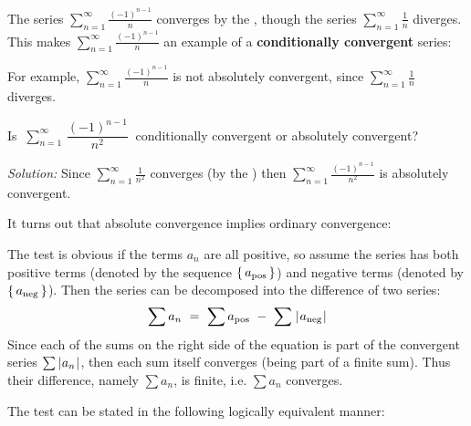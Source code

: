 The series $\sum_{n=1}^{\infty} \frac{(-1)^{n-1}}{n}$ converges by the
, though the series $\sum_{n=1}^{\infty} \frac{1}{n}$
diverges. This makes $\sum_{n=1}^{\infty} \frac{(-1)^{n-1}}{n}$ an example of a
\textbf{conditionally convergent} series:


\noindent For example, $\sum_{n=1}^{\infty} \frac{(-1)^{n-1}}{n}$ is not
absolutely convergent, since $\sum_{n=1}^{\infty} \frac{1}{n}$ diverges.

\begin{exmp}
\noindent Is
$~\displaystyle\sum_{n=1}^{\infty} \,\dfrac{(-1)^{n-1}}{n^2}~$ conditionally
convergent or absolutely convergent?\vspace{1mm}
\par\noindent\emph{Solution:} Since $\sum_{n=1}^{\infty} \frac{1}{n^2}$
converges (by the ) then
$\sum_{n=1}^{\infty} \frac{(-1)^{n-1}}{n^2}$ is absolutely convergent.
\end{exmp}
\divider
\vspace{2mm}

It turns out that absolute convergence implies ordinary convergence:


The test is obvious if the terms $a_n$ are all positive, so assume
the series has both positive terms (denoted by the sequence
$\left\lbrace\mspace{3mu}a_{\text{pos}}\mspace{3mu}\right\rbrace$) and negative terms (denoted by $\left\lbrace\mspace{3mu}a_{\text{neg}}\mspace{3mu}\right\rbrace$).
Then the series can be decomposed into the difference of two series:
\[
\sum a_n ~=~ \sum a_{\text{pos}} ~-~ \sum \;\lvert\mspace{1mu}a_{\text{neg}}\mspace{1mu}\rvert
\]
Since each of the sums on the right side of the equation is part of the
convergent series $\sum \,\lvert\mspace{1mu}a_n\mspace{1mu}\rvert$, then each sum itself converges (being part
of a finite sum). Thus their difference, namely $\sum a_n$, is finite, i.e.
$\sum a_n$ converges.

The test can be stated in the following logically equivalent manner:

